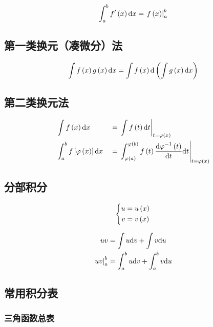 \documentclass{article}
\begin{document}
\[\int_a^b{f^\prime\left(x\right)\mathrm d x}=\left.f\left(x\right)\right|_a^b\]

\subsection{第一类换元（凑微分）法}

\[\int f\left(x\right)g\left(x\right)\mathrm d x=\int f\left(x\right)\mathrm d\left(\int g\left(x\right)\mathrm d x\right)\]

\subsection{第二类换元法}

\[\begin{aligned}
         & \int f\left(x\right)\mathrm d x                &  & =\left.\int f\left(t\right)\mathrm d t\right|_{t=\varphi\left(x\right)}                                                                   \\
         & \int_a^bf\left[\varphi\left(x\right)\right]\mathrm d x &  & =\left.\int_{\varphi\left(a\right)}^{\varphi\left(b\right)}{f\left(t\right)\frac{{\mathrm d\varphi}^{-1}\left(t\right)}{ \mathrm d t}\mathrm d t}\right|_{t=\varphi\left(x\right)}
    \end{aligned}\]

\subsection{分部积分}

\[\left\{\begin{aligned}
        u & =u\left(x\right) \\
        v & =v\left(x\right)
    \end{aligned}\right.\]

\[\begin{aligned}
        uv                  & =\int{u\mathrm dv}+\int{v\mathrm du}         \\
        \left.uv\right|_a^b & =\int_a^b{u\mathrm d v}+\int_a^b{v\mathrm d u}
    \end{aligned}\]

\subsection{常用积分表}

\subsubsection{三角函数总表}
\end{document}
